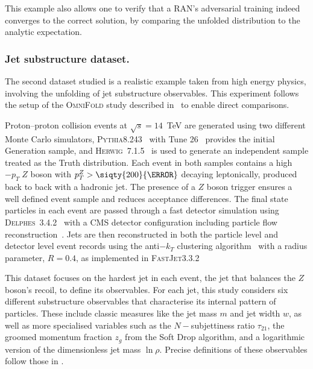 {{            This example also allows one to verify that a RAN’s adversarial training indeed converges to the correct solution, by comparing the unfolded distribution to the analytic expectation.

        \subsubsection{Jet substructure dataset.}
        
            The second dataset studied is a realistic example taken from high energy physics, involving the unfolding of jet substructure observables.
            This experiment follows the setup of the \textsc{OmniFold} study described in~\cite{andreassen_omnifold_2020} to enable direct comparisons.
            
            Proton--proton collision events at $\sqrt{s}=14$~TeV are generated using two different Monte Carlo simulators, \textsc{Pythia}8.243~\cite{Sjostrand:2014zea, Sjostrand:2007gs} with Tune 26~\cite{TheATLAScollaboration:2014rfk} provides the initial Generation sample, and \textsc{Herwig}~7.1.5~\cite{Bellm2017HerwigNote, Bahr:2008pv} is used to generate an independent sample treated as the Truth distribution.
            Each event in both samples contains a high\(-p_T\;Z\) boson with $p_T^Z > \siqty{200}{\GeV}$ decaying leptonically, produced back to back with a hadronic jet.
            The presence of a $Z$ boson trigger ensures a well defined event sample and reduces acceptance differences.
            The final state particles in each event are passed through a fast detector simulation using \textsc{Delphes}~3.4.2~\cite{DeFavereau2014DELPHESExperiment} with a CMS detector configuration including particle flow reconstruction~\cite{Mertens:2015kba, CMS:2017yfk}.
            Jets are then reconstructed in both the particle level and detector level event records using the anti$-k_T$ clustering algorithm~\cite{Cacciari:2008gp} with a radius parameter, $R=0.4$, as implemented in \textsc{FastJet}3.3.2~\cite{Cacciari2012FastJetManual}
            
            This dataset focuses on the hardest jet in each event, the jet that balances the $Z$ boson’s recoil, to define its observables.
            For each jet, this study considers six different substructure observables that characterise its internal pattern of particles.
            These include classic measures like the jet mass $m$ and jet width $w$, as well as more specialised variables such as the \(N-\)subjettiness ratio $\tau_{21}$, the groomed momentum fraction $z_g$ from the Soft Drop algorithm, and a logarithmic version of the dimensionless jet mass $\ln\rho$.
            Precise definitions of these observables follow those in \cite{andreassen_omnifold_2020}.
            
}}
